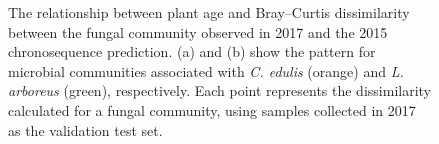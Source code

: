 \clearpage
\begin{figure}[h]
	\centering
	\caption[The relationship between plant age and Bray--Curtis dissimilarity between the fungal community observed in 2017 and the 2015 chronosequence prediction.]
		{\hspace{1mm} The relationship between plant age and Bray--Curtis dissimilarity between the fungal community observed in 2017 and the 2015 chronosequence prediction.
		(a) and (b) show the pattern for microbial communities associated with \textit{C. edulis} (orange) and \textit{L. arboreus} (green), respectively.
		Each point represents the dissimilarity calculated for a fungal community, using samples collected in 2017 as the validation test set. 
		}
	\label{fig:HMSC_Species_Individual_Full2015_SI}
\end{figure}



